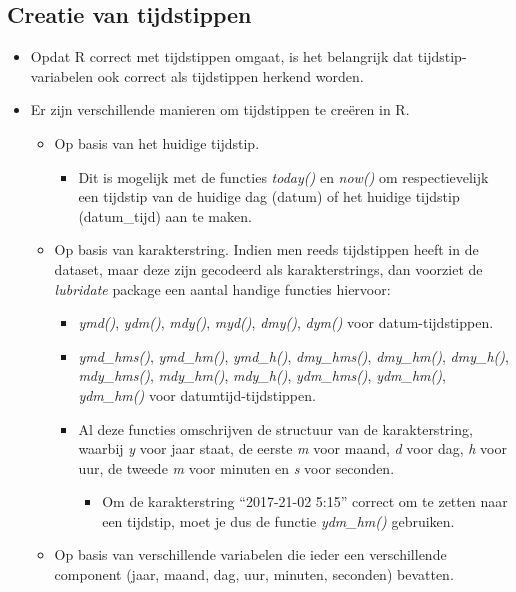 \documentclass[]{memoir}
\providecommand{\tightlist}{%
  \setlength{\itemsep}{0pt}\setlength{\parskip}{0pt}}
\begin{document}
\hypertarget{creatie-van-tijdstippen}{%
\subsection{Creatie van tijdstippen}\label{creatie-van-tijdstippen}}

\begin{itemize}
\tightlist
\item
  Opdat R correct met tijdstippen omgaat, is het belangrijk dat tijdstip-variabelen ook correct als tijdstippen herkend worden.
\item
  Er zijn verschillende manieren om tijdstippen te creëren in R.

  \begin{itemize}
  \tightlist
  \item
    Op basis van het huidige tijdstip.

    \begin{itemize}
    \tightlist
    \item
      Dit is mogelijk met de functies \emph{today()} en \emph{now()} om respectievelijk een tijdstip van de huidige dag (datum) of het huidige tijdstip (datum\_tijd) aan te maken.
    \end{itemize}
  \item
    Op basis van karakterstring. Indien men reeds tijdstippen heeft in de dataset, maar deze zijn gecodeerd als karakterstrings, dan voorziet de \emph{lubridate} package een aantal handige functies hiervoor:

    \begin{itemize}
    \tightlist
    \item
      \emph{ymd()}, \emph{ydm()}, \emph{mdy()}, \emph{myd()}, \emph{dmy()}, \emph{dym()} voor datum-tijdstippen.
    \item
      \emph{ymd\_hms()}, \emph{ymd\_hm()}, \emph{ymd\_h()}, \emph{dmy\_hms()}, \emph{dmy\_hm()}, \emph{dmy\_h()}, \emph{mdy\_hms()}, \emph{mdy\_hm()}, \emph{mdy\_h()}, \emph{ydm\_hms()}, \emph{ydm\_hm()}, \emph{ydm\_hm()} voor datumtijd-tijdstippen.
    \item
      Al deze functies omschrijven de structuur van de karakterstring, waarbij \emph{y} voor jaar staat, de eerste \emph{m} voor maand, \emph{d} voor dag, \emph{h} voor uur, de tweede \emph{m} voor minuten en \emph{s} voor seconden.

      \begin{itemize}
      \tightlist
      \item
        Om de karakterstring ``2017-21-02 5:15'' correct om te zetten naar een tijdstip, moet je dus de functie \emph{ydm\_hm()} gebruiken.
      \end{itemize}
    \end{itemize}
  \item
    Op basis van verschillende variabelen die ieder een verschillende component (jaar, maand, dag, uur, minuten, seconden) bevatten.


\end{itemize}
\end{itemize}
\end{document}
